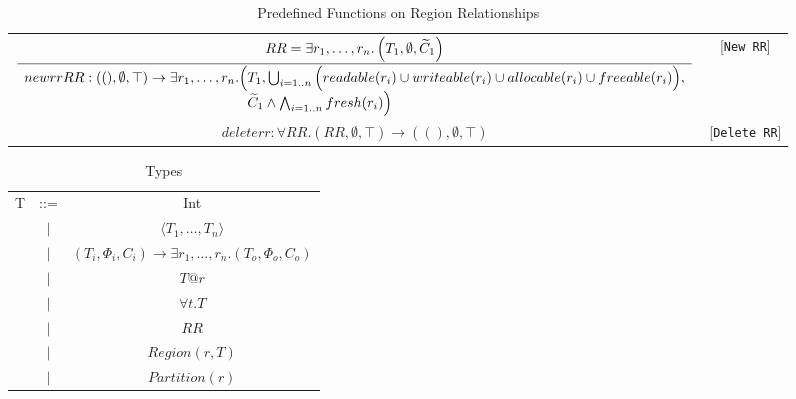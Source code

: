 \documentclass{article}
\newcommand{\infrule}[2]{\displaystyle\frac{\displaystyle\strut{#1}}{\displaystyle\strut {#2}}}
\newcommand{\rtriple}[3]{\left({#1},{#2},{#3}\right)}
\newcommand{\rsingle}[1]{\rtriple{#1}{\emptyset}{\top}}
\newcommand{\rtripsub}[3]{\rtriple{#1}{\Phi_{#2}}{C_{#3}}}
\begin{document}
\begin{table*}
\centering
{\small
\begin{tabular}{cc}

%
%
\begin{math}
\infrule{
  RR = \exists r_1, \ldots, r_n. \rtriple{T_1}{\emptyset}{\widetilde{C}_1}
}{
\begin{array}{l@{}l}
  newrr RR : \rsingle{()} \rightarrow \exists r_1, \ldots, r_n. \Big( & T_1, \bigcup_{i = 1..n} \Big( readable(r_i) \cup writeable(r_i) \cup allocable(r_i) \cup freeable(r_i) \Big), \\
 & \widetilde{C}_1 \wedge \bigwedge_{i = 1..n} fresh(r_i) \Big)
\end{array}
}
\end{math} & [{\tt New RR}] \\

%
%
\begin{math}
deleterr : \forall RR. \rsingle{RR} \rightarrow \rsingle{()}
\end{math} & [{\tt Delete RR}] \\
\end{tabular}
}
\caption{Predefined Functions on Region Relationships}
\end{table*}

\begin{table*}
\centering
{\small
\begin{tabular}{ccc}

T & ::= & Int \\
  &$\mid$&$\langle T_1, \ldots, T_n \rangle$ \\
  &$\mid$&$\rtripsub{T_i}{i}{i} \rightarrow \exists r_1, \ldots, r_n.\rtripsub{T_o}{o}{o}$ \\
  &$\mid$&$T@r$\\
  &$\mid$&$\forall t.T$ \\
  &$\mid$&$RR$ \\
  &$\mid$&$Region(r,T)$ \\
  &$\mid$&$Partition(r)$ \\

\end{tabular}
}
\caption{Types}
\end{table*}
\end{document}
